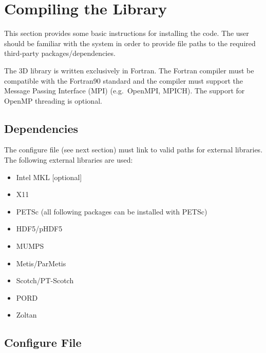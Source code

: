 \section{Compiling the Library}
\label{sec:compiling}

This section provides some basic instructions for installing the code. The user should be familiar with the system in order to provide file paths to the required third-party packages/dependencies.

The \hp3D library is written exclusively in Fortran. The Fortran compiler must be compatible with the Fortran90 standard and the compiler must support the Message Passing Interface (MPI) (e.g.~OpenMPI, MPICH). The support for OpenMP threading is optional.

\subsection{Dependencies}
\label{sec:dependencies}

The configure file  (see next section) must link to valid paths for external libraries. The following external libraries are used:
\begin{itemize}
	\itemsep 0pt
	\item Intel MKL [optional]
	\item X11
	\item PETSc (all following packages can be installed with PETSc)
	\item HDF5/pHDF5
	\item MUMPS
	\item Metis/ParMetis
	\item Scotch/PT-Scotch
	\item PORD
	\item Zoltan
\end{itemize}

\subsection{Configure File}
\label{sec:configure-file}

